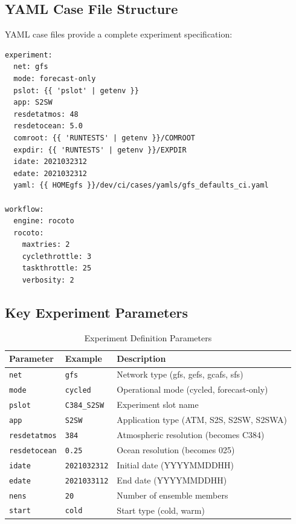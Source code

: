 \documentclass[11pt,letterpaper]{article}
\begin{document}
\subsection{YAML Case File Structure}

YAML case files provide a complete experiment specification:

\begin{lstlisting}[style=yamlstyle, title=Example: C48\_S2SW.yaml]
experiment:
  net: gfs
  mode: forecast-only
  pslot: {{ 'pslot' | getenv }}
  app: S2SW
  resdetatmos: 48
  resdetocean: 5.0
  comroot: {{ 'RUNTESTS' | getenv }}/COMROOT
  expdir: {{ 'RUNTESTS' | getenv }}/EXPDIR
  idate: 2021032312
  edate: 2021032312
  yaml: {{ HOMEgfs }}/dev/ci/cases/yamls/gfs_defaults_ci.yaml

workflow:
  engine: rocoto
  rocoto:
    maxtries: 2
    cyclethrottle: 3
    taskthrottle: 25
    verbosity: 2
\end{lstlisting}

\subsection{Key Experiment Parameters}

\begin{table}[H]
\centering
\caption{Experiment Definition Parameters}
\label{tab:exp-params}
\begin{tabular}{@{}llp{6cm}@{}}
\toprule
\textbf{Parameter} & \textbf{Example} & \textbf{Description} \\
\midrule
\texttt{net} & \texttt{gfs} & Network type (gfs, gefs, gcafs, sfs) \\
\texttt{mode} & \texttt{cycled} & Operational mode (cycled, forecast-only) \\
\texttt{pslot} & \texttt{C384\_S2SW} & Experiment slot name \\
\texttt{app} & \texttt{S2SW} & Application type (ATM, S2S, S2SW, S2SWA) \\
\texttt{resdetatmos} & \texttt{384} & Atmospheric resolution (becomes C384) \\
\texttt{resdetocean} & \texttt{0.25} & Ocean resolution (becomes 025) \\
\texttt{idate} & \texttt{2021032312} & Initial date (YYYYMMDDHH) \\
\texttt{edate} & \texttt{2021033112} & End date (YYYYMMDDHH) \\
\texttt{nens} & \texttt{20} & Number of ensemble members \\
\texttt{start} & \texttt{cold} & Start type (cold, warm) \\
\bottomrule
\end{tabular}
\end{table}
\end{document}
